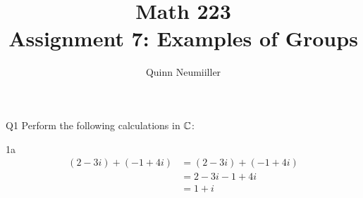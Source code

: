 
\title{Math 223 \\
Assignment 7: Examples of Groups
}
\author{Quinn Neumiiller}
 
\maketitle


\begin{question}{Q1}
Perform the following calculations in $\mathbb{C}$:
\end{question}

\begin{question}{1a}
\begin{align*}
(2-3i)+(-1 +4i) &= (2-3i)+(-1 +4i)\\
&= 2 -3i -1 + 4i\\
&= 1 + i
\end{align*}
\end{question}

